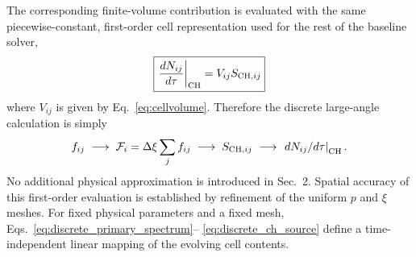 \documentclass[11pt]{article}
\begin{document}
The corresponding finite-volume contribution is evaluated with the same
piecewise-constant, first-order cell representation used for the rest of the baseline
solver,
\begin{equation}
 \boxed{
 \left.\frac{dN_{ij}}{d\tau}\right|_{\rm CH}
 =V_{ij}S_{{\rm CH},ij}
 }
 \label{eq:discrete_ch_source}
\end{equation}
where $V_{ij}$ is given by Eq.~\eqref{eq:cellvolume}.  Therefore the discrete
large-angle calculation is simply
\begin{equation}
 f_{ij}
 \;\longrightarrow\;
 \mathcal F_i=\Delta\xi\sum_j f_{ij}
 \;\longrightarrow\;
 S_{{\rm CH},ij}
 \;\longrightarrow\;
 \left.dN_{ij}/d\tau\right|_{\rm CH}.
\end{equation}
No additional physical approximation is introduced in Sec.~2.  Spatial accuracy of this
first-order evaluation is established by refinement of the uniform $p$ and $\xi$ meshes.
For fixed physical parameters and a fixed mesh, Eqs.~\eqref{eq:discrete_primary_spectrum}--
\eqref{eq:discrete_ch_source} define a time-independent linear mapping of the evolving
cell contents.
\end{document}

